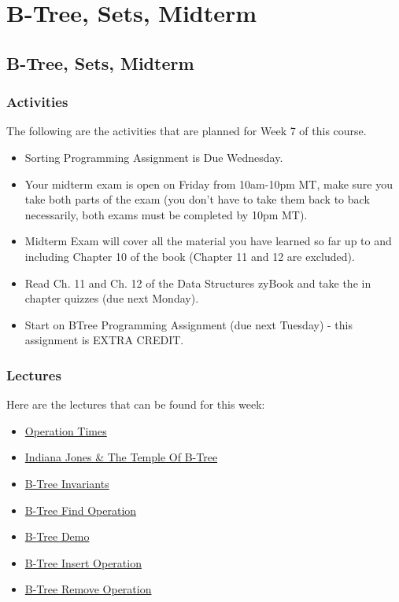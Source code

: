 \clearpage

\renewcommand{\ChapTitle}{B-Tree, Sets, Midterm}

\chapter{\ChapTitle}
\section{\ChapTitle}

\subsection{Activities}

The following are the activities that are planned for Week 7 of this course.

\begin{itemize}
    \item Sorting Programming Assignment is Due Wednesday.
    \item Your midterm exam is open on Friday from 10am-10pm MT, make sure you take both parts of the exam (you don't have to take them back to back necessarily, both exams must be completed by 10pm MT).
    \item Midterm Exam will cover all the material you have learned so far up to and including Chapter 10 of the book (Chapter 11 and 12 are excluded).
    \item Read Ch. 11 and Ch. 12 of the Data Structures zyBook and take the in chapter quizzes (due next Monday).
    \item Start on BTree Programming Assignment (due next Tuesday) - this assignment is EXTRA CREDIT.
\end{itemize}

\subsection{Lectures}

Here are the lectures that can be found for this week:

\begin{itemize}
    \item \href{https://applied.cs.colorado.edu/mod/hvp/view.php?id=45970}{Operation Times}
    \item \href{https://applied.cs.colorado.edu/mod/hvp/view.php?id=45971}{Indiana Jones \& The Temple Of B-Tree}
    \item \href{https://applied.cs.colorado.edu/mod/hvp/view.php?id=45972}{B-Tree Invariants}
    \item \href{https://applied.cs.colorado.edu/mod/hvp/view.php?id=45973}{B-Tree Find Operation}
    \item \href{https://applied.cs.colorado.edu/mod/hvp/view.php?id=45974}{B-Tree Demo}
    \item \href{https://applied.cs.colorado.edu/mod/hvp/view.php?id=45975}{B-Tree Insert Operation}
    \item \href{https://applied.cs.colorado.edu/mod/hvp/view.php?id=45976}{B-Tree Remove Operation}
\end{itemize}

